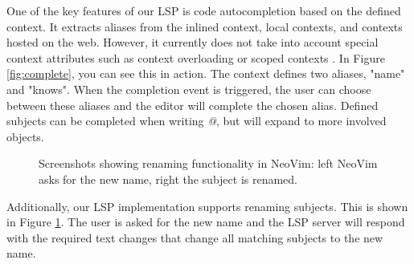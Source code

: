 \documentclass[
]{ceurart}
\begin{document}
One of the key features of our LSP is code autocompletion based on the defined context. It extracts aliases from the inlined context, local contexts, and contexts hosted on the web. However, it currently does not take into account special context attributes such as context overloading or scoped contexts \cite{JSON-LD-W3C}. In Figure \ref{fig:complete}, you can see this in action. The context defines two aliases, "name" and "knows". When the completion event is triggered, the user can choose between these aliases and the editor will complete the chosen alias. Defined subjects can be completed when writing \textit{@}, but will expand to more involved objects.

\begin{figure}
\centering
{}
\caption{Screenshots showing renaming functionality in NeoVim: left NeoVim asks for the new name, right the subject is renamed.}
\label{fig:rename}
\end{figure}

Additionally, our LSP implementation supports renaming subjects. This is shown in Figure \ref{fig:rename}. The user is asked for the new name and the LSP server will respond with the required text changes that change all matching subjects to the new name.
\end{document}
